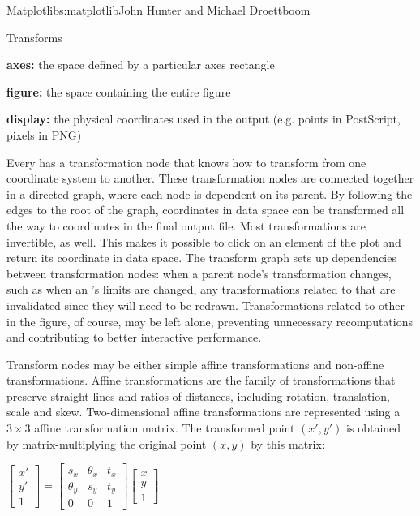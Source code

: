 \begin{aosachapter}{Matplotlib}{s:matplotlib}{John Hunter and Michael Droettboom}
\begin{aosasect1}{Transforms}
\begin{aosaitemize}
\item \textbf{axes:} the space defined by a particular axes rectangle

\item \textbf{figure:} the space containing the entire figure

\item \textbf{display:} the physical coordinates used in the output
  (e.g. points in PostScript, pixels in PNG)
\end{aosaitemize}

Every  has a transformation node that knows how to
transform from one coordinate system to another.  These transformation
nodes are connected together in a directed graph, where each node is
dependent on its parent.  By following the edges to the root of the
graph, coordinates in data space can be transformed all the way to
coordinates in the final output file.  Most transformations are
invertible, as well.  This makes it possible to click on an element of
the plot and return its coordinate in data space.  The transform graph
sets up dependencies between transformation nodes: when a parent
node's transformation changes, such as when an 's limits are
changed, any transformations related to that  are invalidated
since they will need to be redrawn.  Transformations related to other
 in the figure, of course, may be left alone, preventing
unnecessary recomputations and contributing to better interactive
performance.

Transform nodes may be either simple affine transformations and
non-affine transformations.  Affine transformations are the family of
transformations that preserve straight lines and ratios of distances,
including rotation, translation, scale and skew.  Two-dimensional
affine transformations are represented using a $3 \times 3$ affine
transformation matrix.  The transformed point $(x\prime, y\prime)$ is
obtained by matrix-multiplying the original point $(x, y)$ by this
matrix:

\smallskip
\begin{math}
\begin{bmatrix} x' \\ y' \\ 1 \end{bmatrix} = \begin{bmatrix} s_x & \theta_x & t_x \\ \theta_y & s_y & t_y \\ 0 & 0 & 1 \end{bmatrix} \begin{bmatrix} x \\ y \\ 1 \end{bmatrix}
\end{math}
\smallskip


\end{aosasect1}
\end{aosachapter}
